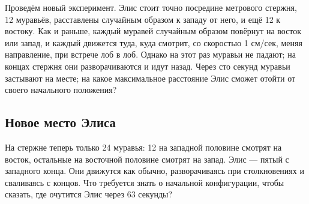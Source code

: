 Проведём новый эксперимент.
Элис стоит точно посредине метрового стержня, 12 муравьёв, расставлены случайным образом к западу от него, и ещё 12 к востоку.
Как и раньше, каждый муравей случайным образом повёрнут на восток или запад, и каждый движется туда, куда смотрит, со скоростью 1 см/сек, меняя направление, при встрече лоб в лоб.
Однако на этот раз муравьи не падают;  
на концах стержня они разворачиваются и идут назад.
Через сто секунд муравьи застывают на месте; на какое максимальное расстояние Элис сможет отойти от своего начального положения?

\subsection*{Новое место Элиса}

На стержне теперь только 24 муравья:
12 на западной половине смотрят на восток,
остальные на восточной половине смотрят на запад.
Элис --- пятый с западного конца.
Они движутся как обычно, разворачиваясь при столкновениях и сваливаясь с концов.
Что требуется знать о начальной конфигурации, чтобы сказать, где очутится Элис через 63 секунды?

